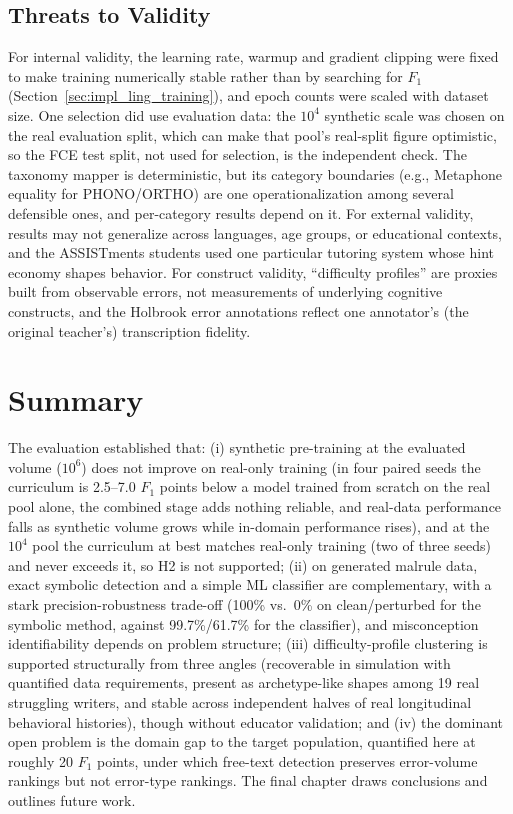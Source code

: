 \subsection{Threats to Validity}
\label{sec:eval_discuss_threats}

For internal validity, the learning rate, warmup and gradient clipping were fixed to make training numerically stable rather than by searching for $F_1$ (Section~\ref{sec:impl_ling_training}), and epoch counts were scaled with dataset size. One selection did use evaluation data: the $10^4$ synthetic scale was chosen on the real evaluation split, which can make that pool's real-split figure optimistic, so the FCE test split, not used for selection, is the independent check. The taxonomy mapper is deterministic, but its category boundaries (e.g., Metaphone equality for PHONO/ORTHO) are one operationalization among several defensible ones, and per-category results depend on it. For external validity, results may not generalize across languages, age groups, or educational contexts, and the ASSISTments students used one particular tutoring system whose hint economy shapes behavior. For construct validity, ``difficulty profiles'' are proxies built from observable errors, not measurements of underlying cognitive constructs, and the Holbrook error annotations reflect one annotator's (the original teacher's) transcription fidelity.

\section{Summary}
\label{sec:eval_summary}

The evaluation established that: (i) synthetic pre-training at the evaluated volume ($10^6$) does not improve on real-only training (in four paired seeds the curriculum is 2.5--7.0 $F_1$ points below a model trained from scratch on the real pool alone, the combined stage adds nothing reliable, and real-data performance falls as synthetic volume grows while in-domain performance rises), and at the $10^4$ pool the curriculum at best matches real-only training (two of three seeds) and never exceeds it, so H2 is not supported; (ii) on generated malrule data, exact symbolic detection and a simple ML classifier are complementary, with a stark precision-robustness trade-off (100\% vs.\ 0\% on clean/perturbed for the symbolic method, against 99.7\%/61.7\% for the classifier), and misconception identifiability depends on problem structure; (iii) difficulty-profile clustering is supported structurally from three angles (recoverable in simulation with quantified data requirements, present as archetype-like shapes among 19 real struggling writers, and stable across independent halves of real longitudinal behavioral histories), though without educator validation; and (iv) the dominant open problem is the domain gap to the target population, quantified here at roughly 20 $F_1$ points, under which free-text detection preserves error-volume rankings but not error-type rankings. The final chapter draws conclusions and outlines future work.
